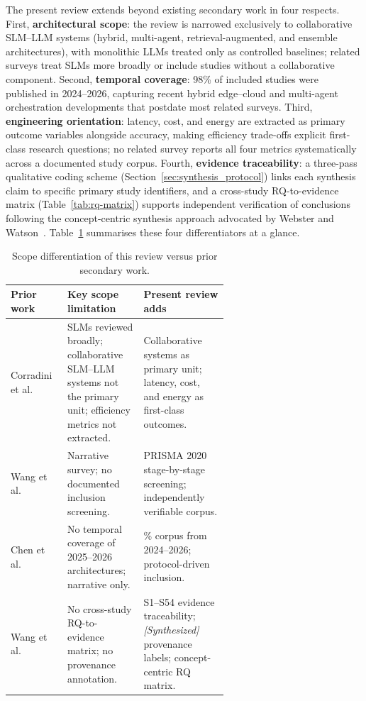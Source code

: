 The present review extends beyond existing secondary work in four respects. First, \textbf{architectural scope}: the review is narrowed exclusively to collaborative SLM--LLM systems (hybrid, multi-agent, retrieval-augmented, and ensemble architectures), with monolithic LLMs treated only as controlled baselines; related surveys treat SLMs more broadly or include studies without a collaborative component. Second, \textbf{temporal coverage}: 98\% of included studies were published in 2024--2026, capturing recent hybrid edge--cloud and multi-agent orchestration developments that postdate most related surveys. Third, \textbf{engineering orientation}: latency, cost, and energy are extracted as primary outcome variables alongside accuracy, making efficiency trade-offs explicit first-class research questions; no related survey reports all four metrics systematically across a documented study corpus. Fourth, \textbf{evidence traceability}: a three-pass qualitative coding scheme (Section~\ref{sec:synthesis_protocol}) links each synthesis claim to specific primary study identifiers, and a cross-study RQ-to-evidence matrix (Table~\ref{tab:rq-matrix}) supports independent verification of conclusions following the concept-centric synthesis approach advocated by Webster and Watson~\cite{webstonwatson2002}. Table~\ref{tab:scope-diff} summarises these four differentiators at a glance.

{\footnotesize
\setlength{\tabcolsep}{3pt}
\renewcommand{\arraystretch}{1.05}
\begin{table}[!htbp]
\centering
\caption{Scope differentiation of this review versus prior secondary work.}
\label{tab:scope-diff}
\begin{tabularx}{\linewidth}{@{} >{\raggedright\arraybackslash}p{0.26\linewidth} >{\raggedright\arraybackslash}p{0.35\linewidth} >{\raggedright\arraybackslash}X @{}}
\toprule
\textbf{Prior work} & \textbf{Key scope limitation} & \textbf{Present review adds} \\
\midrule
Corradini et al.~\cite{slmreview2025prisma} &
SLMs reviewed broadly; collaborative SLM--LLM systems not the primary unit; efficiency metrics not extracted. &
Collaborative systems as primary unit; latency, cost, and energy as first-class outcomes. \\
Wang et al.~\cite{wang2024slmsurvey} &
Narrative survey; no documented inclusion screening. &
PRISMA 2020 stage-by-stage screening; independently verifiable corpus. \\
Chen et al.~\cite{chen2025collabmech} &
No temporal coverage of 2025--2026 architectures; narrative only. &
98\% corpus from 2024--2026; protocol-driven inclusion. \\
Wang et al.~\cite{wang2025collabperf} &
No cross-study RQ-to-evidence matrix; no provenance annotation. &
S1--S54 evidence traceability; \textit{[Synthesized]} provenance labels; concept-centric RQ matrix. \\
\bottomrule
\end{tabularx}
\end{table}
}
